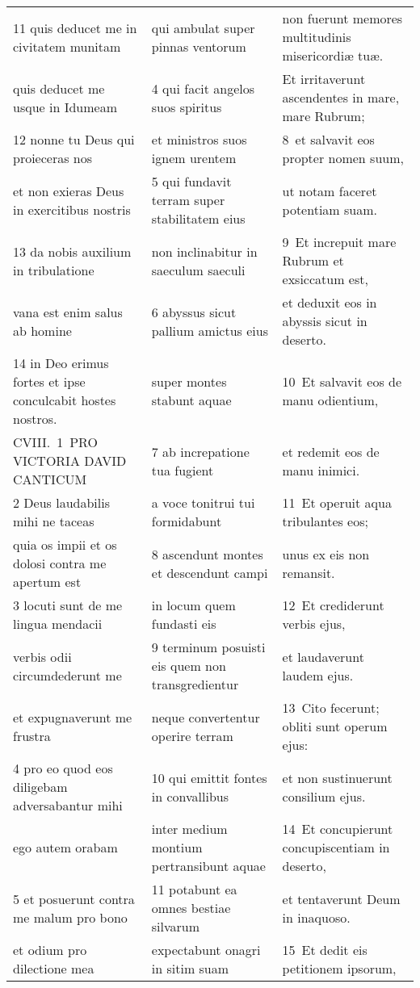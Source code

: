 \documentclass{article}
\begin{document}
\begin{longtable}{@{}p{}p{}p{}@{}}
11 quis deducet me in civitatem munitam	&	qui ambulat super pinnas ventorum	&	non fuerunt memores multitudinis misericordiæ tuæ.	\\
quis deducet me usque in Idumeam	&	4 qui facit angelos suos spiritus	&	Et irritaverunt ascendentes in mare, mare Rubrum;	\\
12 nonne tu Deus qui proieceras nos	&	et ministros suos ignem urentem	&	8 et salvavit eos propter nomen suum,	\\
et non exieras Deus in exercitibus nostris	&	5 qui fundavit terram super stabilitatem eius	&	ut notam faceret potentiam suam.	\\
13 da nobis auxilium in tribulatione	&	non inclinabitur in saeculum saeculi	&	9 Et increpuit mare Rubrum et exsiccatum est,	\\
vana est enim salus ab homine	&	6 abyssus sicut pallium amictus eius	&	et deduxit eos in abyssis sicut in deserto.	\\
14 in Deo erimus fortes et ipse conculcabit hostes nostros.	&	super montes stabunt aquae	&	10 Et salvavit eos de manu odientium,	\\
CVIII. 1 PRO VICTORIA DAVID CANTICUM	&	7 ab increpatione tua fugient	&	et redemit eos de manu inimici.	\\
2 Deus laudabilis mihi ne taceas	&	a voce tonitrui tui formidabunt	&	11 Et operuit aqua tribulantes eos;	\\
quia os impii et os dolosi contra me apertum est	&	8 ascendunt montes et descendunt campi	&	unus ex eis non remansit.	\\
3 locuti sunt de me lingua mendacii	&	in locum quem fundasti eis	&	12 Et crediderunt verbis ejus,	\\
verbis odii circumdederunt me	&	9 terminum posuisti eis quem non transgredientur	&	et laudaverunt laudem ejus.	\\
et expugnaverunt me frustra	&	neque convertentur operire terram	&	13 Cito fecerunt; obliti sunt operum ejus:	\\
4 pro eo quod eos diligebam adversabantur mihi	&	10 qui emittit fontes in convallibus	&	et non sustinuerunt consilium ejus.	\\
ego autem orabam	&	inter medium montium pertransibunt aquae	&	14 Et concupierunt concupiscentiam in deserto,	\\
5 et posuerunt contra me malum pro bono	&	11 potabunt ea omnes bestiae silvarum	&	et tentaverunt Deum in inaquoso.	\\
et odium pro dilectione mea	&	expectabunt onagri in sitim suam	&	15 Et dedit eis petitionem ipsorum,	\\

\end{longtable}
\end{document}
